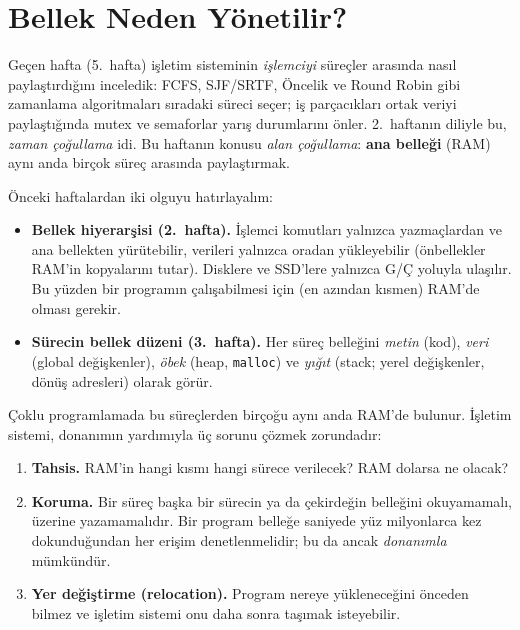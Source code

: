 \documentclass[11pt,a4paper]{article}
\newcommand{\term}[1]{\textbf{\color{mintdeep}#1}}
\newcommand{\cmd}[1]{\texttt{#1}}
\begin{document}
\setcounter{tocdepth}{1}
\tableofcontents

\section{Bellek Neden Yönetilir?}

Geçen hafta (5.~hafta) işletim sisteminin \emph{işlemciyi} süreçler arasında nasıl paylaştırdığını inceledik: FCFS, SJF/SRTF, Öncelik ve Round Robin gibi zamanlama algoritmaları sıradaki süreci seçer; iş parçacıkları ortak veriyi paylaştığında mutex ve semaforlar yarış durumlarını önler. 2.~haftanın diliyle bu, \emph{zaman çoğullama} idi. Bu haftanın konusu \emph{alan çoğullama}: \term{ana belleği} (RAM) aynı anda birçok süreç arasında paylaştırmak.

Önceki haftalardan iki olguyu hatırlayalım:
\begin{itemize}
  \item \textbf{Bellek hiyerarşisi (2.~hafta).} İşlemci komutları yalnızca yazmaçlardan ve ana bellekten yürütebilir, verileri yalnızca oradan yükleyebilir (önbellekler RAM'in kopyalarını tutar). Disklere ve SSD'lere yalnızca G/Ç yoluyla ulaşılır. Bu yüzden bir programın çalışabilmesi için (en azından kısmen) RAM'de olması gerekir.
  \item \textbf{Sürecin bellek düzeni (3.~hafta).} Her süreç belleğini \emph{metin} (kod), \emph{veri} (global değişkenler), \emph{öbek} (heap, \cmd{malloc}) ve \emph{yığıt} (stack; yerel değişkenler, dönüş adresleri) olarak görür.
\end{itemize}

Çoklu programlamada bu süreçlerden birçoğu aynı anda RAM'de bulunur. İşletim sistemi, donanımın yardımıyla üç sorunu çözmek zorundadır:
\begin{enumerate}[leftmargin=1.4em]
  \item \textbf{Tahsis.} RAM'in hangi kısmı hangi sürece verilecek? RAM dolarsa ne olacak?
  \item \textbf{Koruma.} Bir süreç başka bir sürecin ya da çekirdeğin belleğini okuyamamalı, üzerine yazamamalıdır. Bir program belleğe saniyede yüz milyonlarca kez dokunduğundan her erişim denetlenmelidir; bu da ancak \emph{donanımla} mümkündür.
  \item \textbf{Yer değiştirme (relocation).} Program nereye yükleneceğini önceden bilmez ve işletim sistemi onu daha sonra taşımak isteyebilir.
\end{enumerate}
\end{document}
